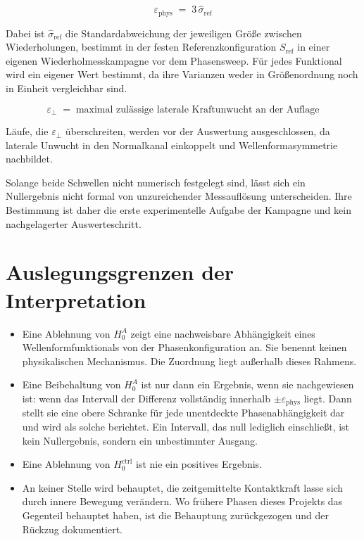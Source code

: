 \documentclass[12pt,a4paper]{report}
\begin{document}
\begin{equation}
  \varepsilon_{\mathrm{phys}} \;=\; 3\,\hat{\sigma}_{\mathrm{ref}}
  \label{eq:eps-phys}
\end{equation}

Dabei ist $\hat{\sigma}_{\mathrm{ref}}$ die Standardabweichung der
jeweiligen Größe zwischen Wiederholungen, bestimmt in der festen
Referenzkonfiguration $S_{\mathrm{ref}}$ in einer eigenen
Wiederholmesskampagne vor dem Phasensweep. Für jedes Funktional wird ein
eigener Wert bestimmt, da ihre Varianzen weder in Größenordnung noch in
Einheit vergleichbar sind.

\begin{equation}
  \varepsilon_{\perp} \;=\;
  \text{maximal zulässige laterale Kraftunwucht an der Auflage}
  \label{eq:eps-perp}
\end{equation}

Läufe, die $\varepsilon_{\perp}$ überschreiten, werden vor der Auswertung
ausgeschlossen, da laterale Unwucht in den Normalkanal einkoppelt und
Wellenformasymmetrie nachbildet.

Solange beide Schwellen nicht numerisch festgelegt sind, lässt sich ein
Nullergebnis nicht formal von unzureichender Messauflösung unterscheiden.
Ihre Bestimmung ist daher die erste experimentelle Aufgabe der Kampagne
und kein nachgelagerter Auswerteschritt.

\section{Auslegungsgrenzen der Interpretation}

\begin{itemize}
  \item Eine Ablehnung von $H_{0}^{A}$ zeigt eine nachweisbare
        Abhängigkeit eines Wellenformfunktionals von der
        Phasenkonfiguration an. Sie benennt keinen physikalischen
        Mechanismus. Die Zuordnung liegt außerhalb dieses Rahmens.
  \item Eine Beibehaltung von $H_{0}^{A}$ ist nur dann ein Ergebnis,
        wenn sie nachgewiesen ist: wenn das Intervall der Differenz
        vollständig innerhalb $\pm\varepsilon_{\mathrm{phys}}$ liegt.
        Dann stellt sie eine obere Schranke für jede unentdeckte
        Phasenabhängigkeit dar und wird als solche berichtet. Ein
        Intervall, das null lediglich einschließt, ist kein
        Nullergebnis, sondern ein unbestimmter Ausgang.
  \item Eine Ablehnung von $H_{0}^{\mathrm{ctrl}}$ ist nie ein positives
        Ergebnis.
  \item An keiner Stelle wird behauptet, die zeitgemittelte Kontaktkraft
        lasse sich durch innere Bewegung verändern. Wo frühere Phasen
        dieses Projekts das Gegenteil behauptet haben, ist die Behauptung
        zurückgezogen und der Rückzug dokumentiert.
\end{itemize}
\end{document}
